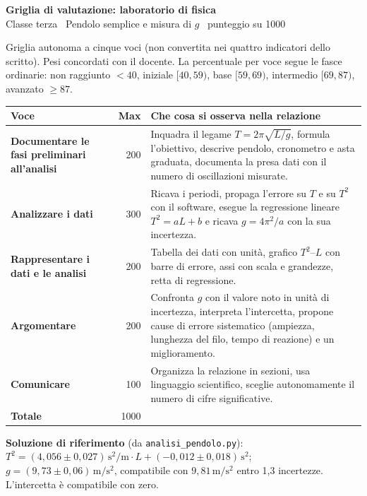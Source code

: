 \documentclass[10pt,a4paper]{article}
\begin{document}
{\Large\bfseries Griglia di valutazione: laboratorio di fisica}\\
Classe terza \textperiodcentered\ Pendolo semplice e misura di $g$ \textperiodcentered\ punteggio su 1000

\medskip
Griglia autonoma a cinque voci (non convertita nei quattro indicatori dello scritto). Pesi concordati con il docente. La percentuale per voce segue le fasce ordinarie: non raggiunto $<40$, iniziale $[40,59)$, base $[59,69)$, intermedio $[69,87)$, avanzato $\ge87$.

\medskip
\begin{tabularx}{\linewidth}{@{}>{\bfseries}p{3.5cm}rX@{}}\toprule
Voce & Max & Che cosa si osserva nella relazione\\\midrule
Documentare le fasi preliminari all'analisi & 200 & Inquadra il legame $T=2\pi\sqrt{L/g}$, formula l'obiettivo, descrive pendolo, cronometro e asta graduata, documenta la presa dati con il numero di oscillazioni misurate.\\
Analizzare i dati & 300 & Ricava i periodi, propaga l'errore su $T$ e su $T^2$ con il software, esegue la regressione lineare $T^2=aL+b$ e ricava $g=4\pi^2/a$ con la sua incertezza.\\
Rappresentare i dati e le analisi & 200 & Tabella dei dati con unità, grafico $T^2$--$L$ con barre di errore, assi con scala e grandezze, retta di regressione.\\
Argomentare & 200 & Confronta $g$ con il valore noto in unità di incertezza, interpreta l'intercetta, propone cause di errore sistematico (ampiezza, lunghezza del filo, tempo di reazione) e un miglioramento.\\
Comunicare & 100 & Organizza la relazione in sezioni, usa linguaggio scientifico, sceglie autonomamente il numero di cifre significative.\\\midrule
Totale & 1000 & \\\bottomrule
\end{tabularx}

\bigskip\textbf{Soluzione di riferimento} (da \texttt{analisi\_pendolo.py}): $T^2=(4{,}056\pm0{,}027)\,\mathrm{s^2/m}\cdot L+(-0{,}012\pm0{,}018)\,\mathrm{s^2}$; $g=(9{,}73\pm0{,}06)\,\mathrm{m/s^2}$, compatibile con $9{,}81\,\mathrm{m/s^2}$ entro 1,3 incertezze. L'intercetta è compatibile con zero.
\end{document}
